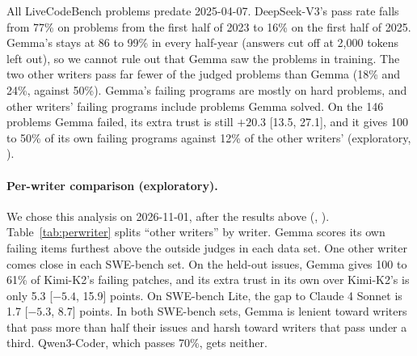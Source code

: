 \documentclass[10pt,letterpaper]{article}
\begin{document}
All LiveCodeBench problems predate 2025-04-07. DeepSeek-V3's pass rate falls from 77\% on problems from the
first half of 2023 to 16\% on the first half of 2025. Gemma's stays at 86 to 99\% in every half-year (answers cut off
at 2,000 tokens left out), so we cannot rule out that Gemma saw the problems in training. The
two other writers pass far fewer of the judged problems than Gemma (18\% and 24\%, against 50\%). Gemma's failing
programs are mostly on hard problems, and other writers' failing programs include problems Gemma solved. On the 146
problems Gemma failed, its extra trust is still $+20.3$ [13.5, 27.1], and it gives 100 to 50\% of its own failing
programs against 12\% of the other writers' (exploratory, ).

\paragraph{Per-writer comparison (exploratory).} We chose this analysis on 2026-11-01, after the results above
(, ).
Table~\ref{tab:perwriter} splits ``other writers'' by writer. Gemma scores its own failing items furthest above the outside judges in each
data set. One other writer comes close in each SWE-bench set. On the held-out issues, Gemma gives 100 to 61\% of
Kimi-K2's failing patches, and its extra trust in its own over Kimi-K2's is only 5.3 [$-5.4$, 15.9] points. On
SWE-bench Lite, the gap to Claude 4 Sonnet is 1.7 [$-5.3$, 8.7] points. In both SWE-bench sets, Gemma is lenient
toward writers that pass more than half their issues and harsh toward writers that pass under a third. Qwen3-Coder,
which passes 70\%, gets neither.
\end{document}
